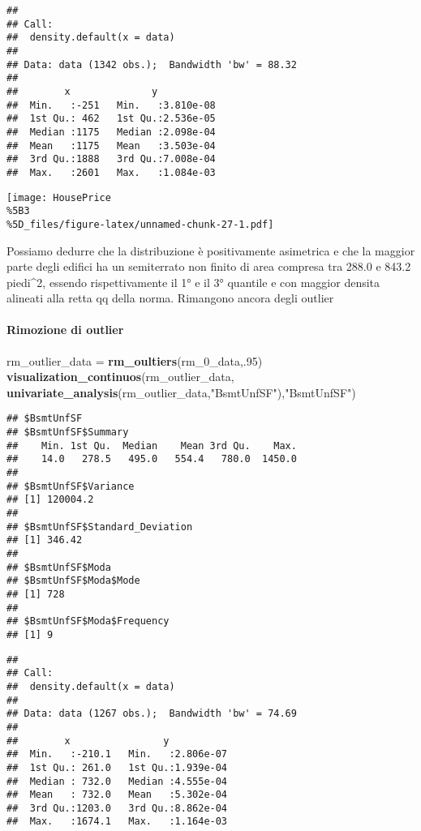 \documentclass[
]{article}
\newenvironment{Shaded}{\begin{snugshade}}{\end{snugshade}}
\newcommand{\DecValTok}[1]{\textcolor[rgb]{0.00,0.00,0.81}{#1}}
\newcommand{\FunctionTok}[1]{\textcolor[rgb]{0.13,0.29,0.53}{\textbf{#1}}}
\newcommand{\NormalTok}[1]{#1}
\newcommand{\OtherTok}[1]{\textcolor[rgb]{0.56,0.35,0.01}{#1}}
\newcommand{\StringTok}[1]{\textcolor[rgb]{0.31,0.60,0.02}{#1}}
\begin{document}
\begin{verbatim}
## 
## Call:
##  density.default(x = data)
## 
## Data: data (1342 obs.);  Bandwidth 'bw' = 88.32
## 
##        x              y            
##  Min.   :-251   Min.   :3.810e-08  
##  1st Qu.: 462   1st Qu.:2.536e-05  
##  Median :1175   Median :2.098e-04  
##  Mean   :1175   Mean   :3.503e-04  
##  3rd Qu.:1888   3rd Qu.:7.008e-04  
##  Max.   :2601   Max.   :1.084e-03
\end{verbatim}

\texttt{[image: HousePrice\\\%5B3\\\%5D\_files/figure-latex/unnamed-chunk-27-1.pdf]}

Possiamo dedurre che la distribuzione è positivamente asimetrica e che
la maggior parte degli edifici ha un semiterrato non finito di area
compresa tra 288.0 e 843.2 piedi\^{}2, essendo rispettivamente il 1° e
il 3° quantile e con maggior densita alineati alla retta qq della norma.
Rimangono ancora degli outlier

\paragraph{Rimozione di outlier}\label{rimozione-di-outlier-4}

\begin{Shaded}
\begin{Highlighting}[]
\NormalTok{rm\_outlier\_data }\OtherTok{=} \FunctionTok{rm\_oultiers}\NormalTok{(rm\_0\_data,.}\DecValTok{95}\NormalTok{)}
\FunctionTok{visualization\_continuos}\NormalTok{(rm\_outlier\_data, }\FunctionTok{univariate\_analysis}\NormalTok{(rm\_outlier\_data,}\StringTok{"BsmtUnfSF"}\NormalTok{),}\StringTok{"BsmtUnfSF"}\NormalTok{)}
\end{Highlighting}
\end{Shaded}

\begin{verbatim}
## $BsmtUnfSF
## $BsmtUnfSF$Summary
##    Min. 1st Qu.  Median    Mean 3rd Qu.    Max. 
##    14.0   278.5   495.0   554.4   780.0  1450.0 
## 
## $BsmtUnfSF$Variance
## [1] 120004.2
## 
## $BsmtUnfSF$Standard_Deviation
## [1] 346.42
## 
## $BsmtUnfSF$Moda
## $BsmtUnfSF$Moda$Mode
## [1] 728
## 
## $BsmtUnfSF$Moda$Frequency
## [1] 9
\end{verbatim}

\begin{verbatim}
## 
## Call:
##  density.default(x = data)
## 
## Data: data (1267 obs.);  Bandwidth 'bw' = 74.69
## 
##        x                y            
##  Min.   :-210.1   Min.   :2.806e-07  
##  1st Qu.: 261.0   1st Qu.:1.939e-04  
##  Median : 732.0   Median :4.555e-04  
##  Mean   : 732.0   Mean   :5.302e-04  
##  3rd Qu.:1203.0   3rd Qu.:8.862e-04  
##  Max.   :1674.1   Max.   :1.164e-03
\end{verbatim}
\end{document}
